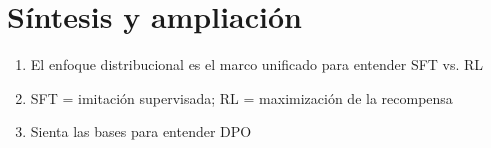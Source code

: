 \section{Síntesis y ampliación}
\begin{enumerate}
  \item El enfoque distribucional es el marco unificado para entender SFT vs. RL
  \item SFT = imitación supervisada; RL = maximización de la recompensa
  \item Sienta las bases para entender DPO
\end{enumerate}


